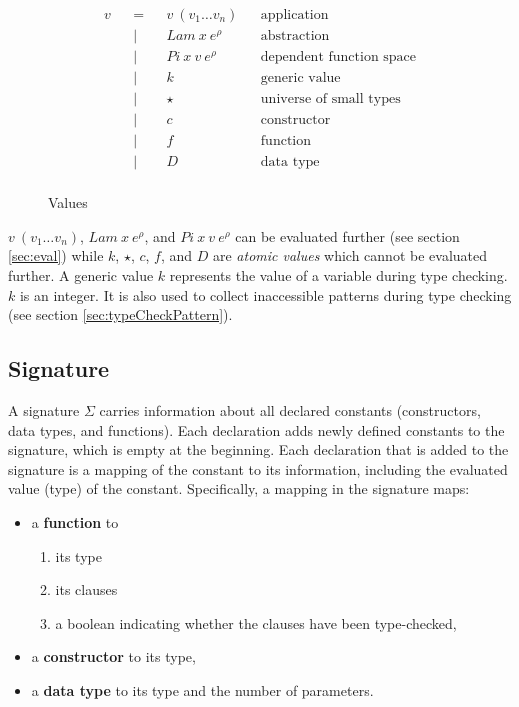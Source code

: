 \begin{figure}[H]
  \begin{equation*}
    \label{eq:values}
    \begin{aligned}
      v &  & = &  & v \: (v_1 \dots v_n)     &  & \textrm{application}              \\
        &  & | &  & Lam \: x \: e^{\rho}     &  & \textrm{abstraction}              \\
        &  & | &  & Pi \: x \: v \: e^{\rho} &  & \textrm{dependent function space} \\
        &  & | &  & k                        &  & \textrm{generic value}            \\
        &  & | &  & \star                    &  & \textrm{universe of small types}  \\
        &  & | &  & c                        &  & \textrm{constructor}              \\
        &  & | &  & f                        &  & \textrm{function}                 \\
        &  & | &  & D                        &  & \textrm{data type}                \\
    \end{aligned}
  \end{equation*}
  \caption{Values}
\end{figure}

$v \: (v_1 \dots v_n)$, $Lam \: x \: e^{\rho}$, and $Pi \: x \: v \: e^{\rho}$
can be evaluated further (see section \ref{sec:eval}) while $k$, $\star$, $c$, $f$, and $D$ are \emph{atomic values}
which cannot be evaluated further. A generic value $k$ represents the value of a variable during type
checking. $k$ is an integer. It is also used to collect inaccessible patterns during type checking (see section \ref{sec:typeCheckPattern}).

\subsection{Signature}
A signature $\Sigma$ carries information about all declared constants (constructors, data types, and functions). Each declaration adds newly defined constants to the signature, which is empty at the beginning. Each declaration that is added to the signature is a mapping of the constant to its information, including the evaluated value (type) of the constant. Specifically, a mapping in the signature maps:

\begin{itemize}
  \item a \textbf{function} to
        \begin{enumerate}
          \item its type
          \item its clauses
          \item a boolean indicating whether the clauses have been type-checked,
        \end{enumerate}
  \item a \textbf{constructor} to its type,
  \item a \textbf{data type} to its type and the number of parameters.
\end{itemize}


